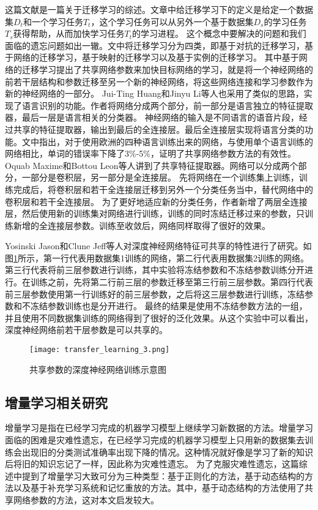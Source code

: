 这篇文献\cite{10.1007/978-3-030-01424-7_27}是一篇关于迁移学习的综述。文章中给迁移学习下的定义是给定一个数据集$D_t$和一个学习任务$T_t$，这个学习任务可以从另外一个基于数据集$D_s$的学习任务$T_s$获得帮助，从而加快学习任务$T_t$的学习进程。
这个概念中要解决的问题和我们面临的遗忘问题如出一辙。文中将迁移学习分为四类，即基于对抗的迁移学习，基于网络的迁移学习，基于映射的迁移学习以及基于实例的迁移学习。
其中基于网络的迁移学习提出了共享网络参数来加快目标网络的学习，就是将一个神经网络的前若干层结构和参数迁移至另一个新的神经网络，将这些网络连接和学习参数作为新的神经网络的一部分。
Jui-Ting Huang和Jinyu Li等人\cite{6639081}也采用了类似的思路，实现了语言识别的功能。作者将网络分成两个部分，前一部分是语言独立的特征提取器，最后一层是语言相关的分类器。
神经网络的输入是不同语言的语音片段，经过共享的特征提取器，输出到最后的全连接层。最后全连接层实现将语言分类的功能。文中指出，对于使用欧洲的四种语言训练出来的网络，与使用单个语言训练的网络相比，单词的错误率下降了3\%-5\%，证明了共享网络参数方法的有效性。
Oquab Maxime和Bottou Leon等人\cite{Oquab_2014_CVPR}讲到了共享特征提取器。网络可以分成两个部分，一部分是卷积层，另一部分是全连接层。
先将网络在一个训练集上训练，训练完成后，将卷积层和若干全连接层迁移到另外一个分类任务当中，替代网络中的卷积层和若干全连接层。
为了更好地适应新的分类任务，作者新增了两层全连接层，然后使用新的训练集对网络进行训练，训练的同时冻结迁移过来的参数，只训练新增的全连接层参数。训练至收敛后，网络同样取得了很好的效果。 

Yosinski Jason和Clune Jeff等人\cite{yosinski_2014_NIPS}对深度神经网络特征可共享的特性进行了研究。如图\ref{fig:transfer_learning_3}所示，第一行代表用数据集1训练的网络，第二行代表用数据集2训练的网络。
第三行代表将前三层参数进行训练，其中实验将冻结参数和不冻结参数训练分开进行。在训练之前，先将第二行前三层的参数迁移至第三行前三层参数。第四行代表前三层参数使用第一行训练好的前三层参数，之后将这三层参数进行训练，冻结参数和不冻结参数训练也是分开进行。
最终的结果是使用不冻结参数方法的一组，并且使用不同数据集训练的网络得到了很好的泛化效果。从这个实验中可以看出，深度神经网络前若干层参数是可以共享的。
\begin{figure}
    \centering
    \texttt{[image: transfer\_learning\_3.png]}
    \caption{共享参数的深度神经网络训练示意图}
    \label{fig:transfer_learning_3}
\end{figure}

\subsection{增量学习相关研究}
增量学习是指在已经学习完成的机器学习模型上继续学习新数据的方法。增量学习面临的困难是灾难性遗忘，在已经学习完成的机器学习模型上只用新的数据集去训练会出现旧的分类测试准确率出现下降的情况。这种情况就好像是学习了新的知识后将旧的知识忘记了一样，因此称为灾难性遗忘。
为了克服灾难性遗忘，这篇综述\cite{PARISI201954}中提到了增量学习大致可分为三种类型：基于正则化的方法，基于动态结构的方法以及基于补充学习系统和记忆重放的方法。其中，基于动态结构的方法使用了共享网络参数的方法，这对本文启发较大。

